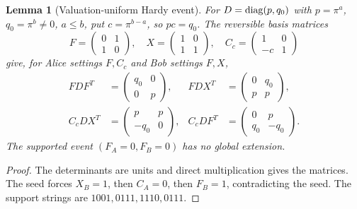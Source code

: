 \documentclass[11pt]{article}
\newtheorem{lemma}[theorem]{Lemma}
\theoremstyle{remark}
\begin{document}
\begin{lemma}[Valuation-uniform Hardy event]
For $D=\operatorname{diag}(p,q_0)$ with $p=\pi^a$, $q_0=\pi^b\ne0$, $a\leq b$, put
$c=\pi^{b-a}$, so $pc=q_0$. The reversible basis matrices
\[
 F=\begin{pmatrix}0&1\\1&0\end{pmatrix},\quad
 X=\begin{pmatrix}1&0\\1&1\end{pmatrix},\quad
 C_c=\begin{pmatrix}1&0\\-c&1\end{pmatrix}
\]
give, for Alice settings $F,C_c$ and Bob settings $F,X$,
\begin{align*}
 FDF^T&=\begin{pmatrix}q_0&0\\0&p\end{pmatrix},&
 FDX^T&=\begin{pmatrix}0&q_0\\p&p\end{pmatrix},\\
 C_cDX^T&=\begin{pmatrix}p&p\\-q_0&0\end{pmatrix},&
 C_cDF^T&=\begin{pmatrix}0&p\\q_0&-q_0\end{pmatrix}.
\end{align*}
The supported event $(F_A=0,F_B=0)$ has no global extension.
\end{lemma}
\begin{proof}
The determinants are units and direct multiplication gives the matrices.
The seed forces $X_B=1$, then $C_A=0$, then $F_B=1$, contradicting the seed.
The support strings are $1001,0111,1110,0111$.
\end{proof}
\end{document}
